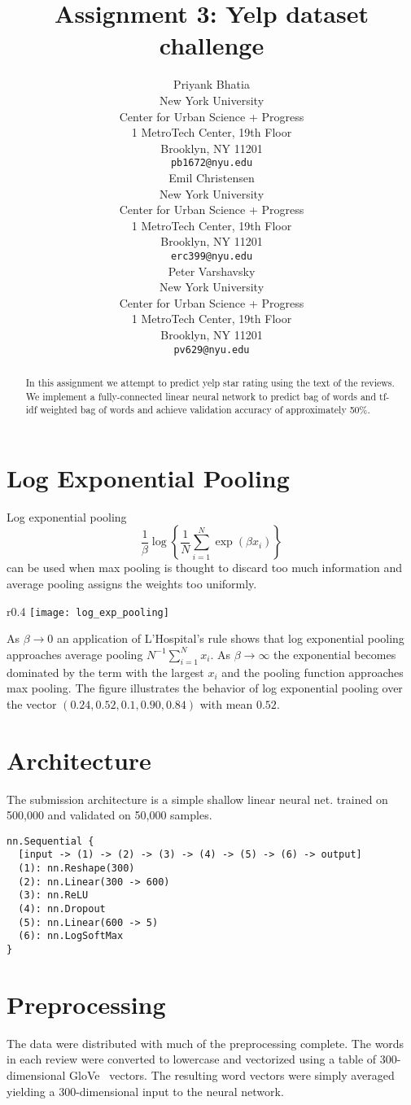 \documentclass{article} %
\title{Assignment 3: Yelp dataset challenge}
\author{
Priyank Bhatia \\
New York University \\
Center for Urban Science + Progress \\
1 MetroTech Center, 19th Floor \\
Brooklyn, NY 11201 \\
\texttt{pb1672@nyu.edu} \\
\AND
Emil Christensen \\
New York University \\
Center for Urban Science + Progress \\
1 MetroTech Center, 19th Floor \\
Brooklyn, NY 11201 \\
\texttt{erc399@nyu.edu} \\
\And
Peter Varshavsky \\
New York University \\
Center for Urban Science + Progress \\
1 MetroTech Center, 19th Floor \\
Brooklyn, NY 11201 \\
\texttt{pv629@nyu.edu} \\
}
\begin{document}
\maketitle


\begin{abstract}
In this assignment we attempt to predict yelp star rating using the text of the reviews. We implement a fully-connected linear neural network to predict bag of words and tf-idf weighted bag of words and achieve validation accuracy of approximately 50\%.\end{abstract}

\section{Log Exponential Pooling}
Log exponential pooling
\[
\frac{1}{\beta}\log\left\{
	\frac{1}{N}
	\sum_{i=1}^N
	\exp\left(\beta x_i \right)
	\right\}
\]
can be used when max pooling is thought to discard too much information and average pooling assigns the weights too uniformly.
\begin{wrapfigure}{r}{0.4\textwidth}
\texttt{[image: log\_exp\_pooling]}
\end{wrapfigure}
As $\beta \rightarrow 0$ an application of L'Hospital's rule shows that log exponential pooling approaches average pooling $N^{-1}\sum_{i=1}^N x_i$.
As $\beta \rightarrow \infty$ the exponential becomes dominated by the term with the largest $x_i$ and the pooling function approaches max pooling.
The figure illustrates the behavior of log exponential pooling over the vector $(0.24, 0.52, 0.1, 0.90, 0.84)$ with mean $0.52$.

\section{Architecture}
\label{arc}

The submission architecture is a simple shallow linear neural net. trained on 500,000 and validated on 50,000 samples.
\begin{lstlisting}
nn.Sequential {
  [input -> (1) -> (2) -> (3) -> (4) -> (5) -> (6) -> output]
  (1): nn.Reshape(300)
  (2): nn.Linear(300 -> 600)
  (3): nn.ReLU
  (4): nn.Dropout
  (5): nn.Linear(600 -> 5)
  (6): nn.LogSoftMax
}

\end{lstlisting}

\section{Preprocessing}
\label{preproc}
The data were distributed with much of the preprocessing complete.
The words in each review were converted to lowercase and vectorized using a table of 300-dimensional GloVe~\cite{} vectors.
The resulting word vectors were simply averaged yielding a 300-dimensional input to the neural network.
\end{document}
